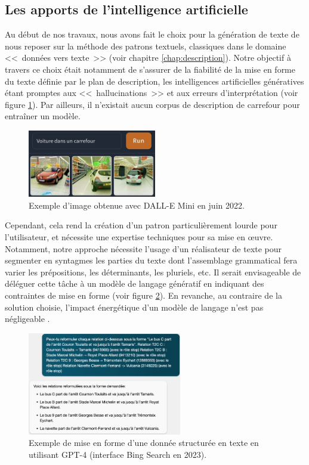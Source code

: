 \subsection{Les apports de l'intelligence artificielle}

Au début de nos travaux, nous avons fait le choix pour la génération de texte de nous reposer sur la méthode des patrons textuels, classiques dans le domaine <<~données vers texte~>> (voir chapitre \ref{chap:description}). Notre objectif à travers ce choix était notamment de s'assurer de la fiabilité de la mise en forme du texte définie par le plan de description, les intelligences artificielles génératives étant promptes aux <<~hallucinations~>> \citep{ye2023} et aux erreurs d'interprétation (voir figure \ref{fig:conclusion_dallemini}). Par ailleurs, il n'existait aucun corpus de description de carrefour pour entraîner un modèle.

\begin{figure}[ht]
    \centering
    \includegraphics[width=0.5\textwidth]{images/conclusion/dallemini_voiture.jpeg}
    \caption[Une voiture dans un carrefour]{Exemple d'image obtenue avec DALL-E Mini en juin 2022.}
    \label{fig:conclusion_dallemini}
\end{figure}

Cependant, cela rend la création d'un patron particulièrement lourde pour l'utilisateur, et nécessite une expertise techniques pour sa mise en œuvre. Notamment, notre approche nécessite l'usage d'un réalisateur de texte pour segmenter en syntagmes les parties du texte dont l'assemblage grammatical fera varier les prépositions, les déterminants, les pluriels, etc. Il serait envisageable de déléguer cette tâche à un modèle de langage génératif en indiquant des contraintes de mise en forme \citep{white2023prompt} (voir figure \ref{fig:conclusion_testgpt}). En revanche, au contraire de la solution choisie, l'impact énergétique d'un modèle de langage n'est pas négligeable \citep{devries2023}.

\begin{figure}[ht]
    \centering
    \includegraphics[width=0.6\textwidth]{images/conclusion/test_gpt.png}
    \caption[Mise en forme textuelle avec GPT-4]{Exemple de mise en forme d'une donnée structurée en texte en utilisant GPT-4 (interface Bing Search en 2023).}
    \label{fig:conclusion_testgpt}
\end{figure}